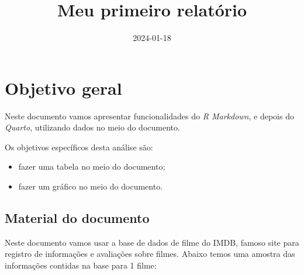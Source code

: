 \documentclass[
]{article}
\title{Meu primeiro relatório}
\author{}
\date{\vspace{-2.5em}2024-01-18}
\begin{document}
\maketitle

\hypertarget{objetivo-geral}{%
\section{Objetivo geral}\label{objetivo-geral}}

Neste documento vamos apresentar funcionalidades do \emph{R Markdown}, e
depois do \emph{Quarto}, utilizando dados no meio do documento.

Os objetivos específicos desta análise são:

\begin{itemize}
\item
  fazer uma tabela no meio do documento;
\item
  fazer um gráfico no meio do documento.
\end{itemize}

\hypertarget{material-do-documento}{%
\subsection{Material do documento}\label{material-do-documento}}

Neste documento vamos usar a base de dados de filme do IMDB, famoso site
para registro de informações e avaliações sobre filmes. Abaixo temos uma
amostra das informações contidas na base para 1 filme:
\end{document}
